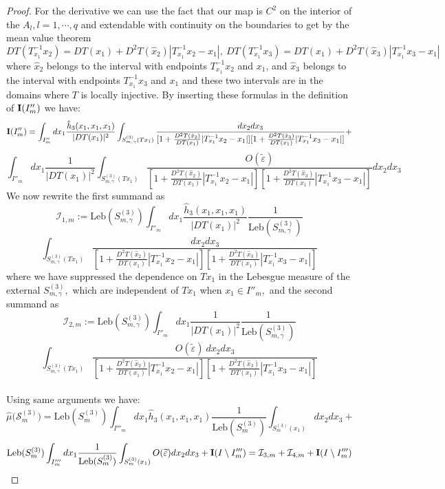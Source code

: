 \documentclass[12pt,reqno,a4paper]{amsart}
\let\tilde\widetilde
\def\Le{\text{Leb}}
\def\eps{\varepsilon}
\def\eps {\varepsilon}
\begin{document}
\begin{proof}
For the derivative we can use the fact that our map is $C^2$ on the interior of the $A_l, l=1,\cdots,q$ and extendable with continuity on the boundaries to get by the mean value  theorem
$$
DT(T_{x_1}^{-1}x_2)=DT(x_1)+D^2T(\hat{x}_2)|T_{x_1}^{-1}x_2-x_1|, \
DT(T_{x_1}^{-1}x_3)=DT(x_1)+D^2T(\hat{x}_3)|T_{x_1}^{-1}x_3-x_1|
$$
where $\hat{x}_2$ belongs to the interval with endpoints $T_{x_1}^{-1}x_2$ and $x_1$, and $\hat{x}_3$ belongs to the interval with endpoints $T_{x_1}^{-1}x_3$ and $x_1$ and these two intervals are in the domains where $T$ is locally injective.   By inserting these formulas in the definition of ${\bf I}(I''_m)$ we have:
$$
{\bf I}(I''_m)=\int_{I''_m} dx_1 \frac{\hat{h}_3(x_1,x_1,x_1)}{|DT(x_1)|^2}\int_{S^{(3)}_{m,\gamma}(Tx_1)}\frac{dx_2dx_3}{ [1+\frac{D^2T(\hat{x}_2)}{DT(x_1)}|T_{x_1}^{-1}x_2-x_1|][1+\frac{D^2T(\hat{x}_3)}{DT(x_1)}|T_{x_1}^{-1}x_3-x_1|]}+$$
$$
\int_{I''_m} dx_1 \frac{1}{|DT(x_1)|^2}\int_{S^{(3)}_{m,\gamma}(Tx_1)}\frac{O(\tilde{\eps})}{ [1+\frac{D^2T(\hat{x}_2)}{DT(x_1)}|T_{x_1}^{-1}x_2-x_1|][1+\frac{D^2T(\hat{x}_3)}{DT(x_1)}|T_{x_1}^{-1}x_3-x_1|]}dx_2dx_3
$$
We now rewrite the first summand as
$$
\mathcal{I}_{1,m}:=\Le(S^{(3)}_{m,\gamma})\int_{I''_m} dx_1 \frac{\hat{h}_3(x_1,x_1,x_1)}{|DT(x_1)|^2}\frac{1}{\Le(S^{(3)}_{m,\gamma})}
$$
\begin{equation}\label{C1}
\int_{S^{(3)}_{m,\gamma}(Tx_1)}\frac{dx_2dx_3}{ [1+\frac{D^2T(\hat{x}_2)}{DT(x_1)}|T_{x_1}^{-1}x_2-x_1|][1+\frac{D^2T(\hat{x}_3)}{DT(x_1)}|T_{x_1}^{-1}x_3-x_1|]}
\end{equation}
where we have suppressed the dependence on $Tx_1$ in the Lebesgue measure of the external $S^{(3)}_{m,\gamma},$ which are independent of $Tx_1$ when $x_1\in I''_m,$ and the second summand  as
$$
\mathcal{I}_{2,m}:=\Le(S^{(3)}_{m,\gamma})\int_{I''_m}dx_1\frac{1}{|DT(x_1)|^2}\frac{1}{\Le(S^{(3)}_{m,\gamma})}$$$$\int_{S^{(3)}_{m,\gamma}(Tx_1)}\frac{O(\tilde{\eps})\ dx_2dx_3}{ [1+\frac{D^2T(\hat{x}_2)}{DT(x_1)}|T_{x_1}^{-1}x_2-x_1|][1+\frac{D^2T(\hat{x}_3)}{DT(x_1)}|T_{x_1}^{-1}x_3-x_1|]}
$$
\\ Using same arguments we have:
$$
\hat{\mu}\big(\mathcal{S}^{(3)}_{m})=\Le(S^{(3)}_{m})\int_{I'''_m} dx_1 \hat{h}_3(x_1,x_1,x_1)\frac{1}{\Le(S^{(3)}_{m})}\int_{S^{(3)}_{m}(x_1)} dx_2dx_3+
$$
\begin{equation}\label{C2}
\Le(S^{(3)}_{m})\int_{I'''_m}dx_1\frac{1}{\Le(S^{(3)}_{m})} \int_{S^{(3)}_{m}(x_1)}O(\tilde{\eps})  dx_2dx_3+{\bf I}(I\setminus I'''_m)=\mathcal{I}_{3,m}+\mathcal{I}_{4,m}+{\bf I}(I\setminus I'''_m)
\end{equation}

\end{proof}
\end{document}
